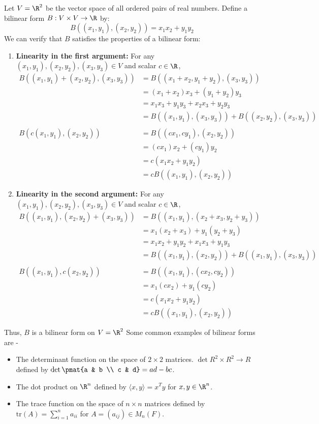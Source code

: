 \documentclass[openany]{book}
\begin{document}
\begin{example}
Let $V = \R^2$ be the vector space of all ordered pairs of real numbers. Define a bilinear form $B: V \times V \to \R$ by:
$$B((x_1, y_1), (x_2, y_2)) = x_1x_2 + y_1y_2$$
We can verify that $B$ satisfies the properties of a bilinear form:
\begin{enumerate}
    \item \textbf{Linearity in the first argument:} For any $(x_1, y_1), (x_2, y_2), (x_3, y_3) \in V$ and scalar $c \in \R$,
    \[\begin{aligned}
    B((x_1, y_1) + (x_2, y_2), (x_3, y_3)) &= B((x_1 + x_2, y_1 + y_2), (x_3, y_3)) \\
    &= (x_1 + x_2)x_3 + (y_1 + y_2)y_3 \\
    &= x_1x_3 + y_1y_3 + x_2x_3 + y_2y_3 \\
    &= B((x_1, y_1), (x_3, y_3)) + B((x_2, y_2), (x_3, y_3)) \\ \\
    B(c(x_1, y_1), (x_2, y_2)) &= B((cx_1, cy_1), (x_2, y_2)) \\
    &= (cx_1)x_2 + (cy_1)y_2 \\
    &= c(x_1x_2 + y_1y_2) \\
    &= cB((x_1, y_1), (x_2, y_2))
    \end{aligned}\]
    \item \textbf{Linearity in the second argument:} For any $(x_1, y_1), (x_2, y_2), (x_3, y_3) \in V$ and scalar $c \in \R$,
    \[\begin{aligned}
    B((x_1, y_1), (x_2, y_2) + (x_3, y_3)) &= B((x_1, y_1), (x_2 + x_3, y_2 + y_3)) \\
    &= x_1(x_2 + x_3) + y_1(y_2 + y_3) \\
    &= x_1x_2 + y_1y_2 + x_1x_3 + y_1y_3 \\
    &= B((x_1, y_1), (x_2, y_2)) + B((x_1, y_1), (x_3, y_3)) \\ \\
    B((x_1, y_1), c(x_2, y_2)) &= B((x_1, y_1), (cx_2, cy_2)) \\
    &= x_1(cx_2) + y_1(cy_2) \\
    &= c(x_1x_2 + y_1y_2) \\
    &= cB((x_1, y_1), (x_2, y_2))
    \end{aligned}\]
\end{enumerate}
Thus, $B$ is a bilinear form on $V = \R^2$
Some common examples of bilinear forms are - 
\begin{itemize}
    \item The determinant function on the space of $2 \times 2$ matrices.
    $\det R^2 \times R^2 \to R$ defined by $\det\pmat{a & b \\ c & d} = ad - bc$.
    \item The dot product on $\R^n$ defined by $\langle x, y \rangle = x^Ty$ for $x, y \in \R^n$.
    \item The trace function on the space of $n \times n$ matrices defined by $\text{tr}(A) = \sum_{i=1}^n a_{ii}$ for $A = (a_{ij}) \in M_n(F)$.
\end{itemize}
\end{example}
\end{document}
